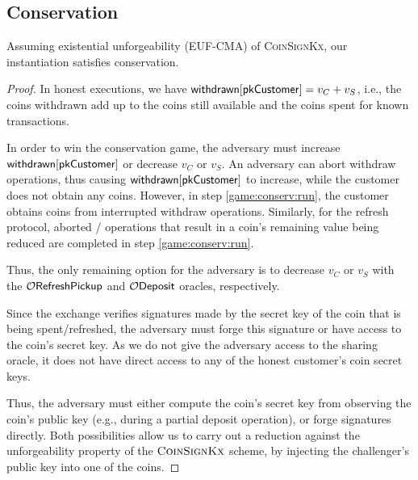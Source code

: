 \subsection{Conservation}

\begin{theorem}
  Assuming existential unforgeability (EUF-CMA) of \textsc{CoinSignKx}, our instantiation satisfies conservation.
\end{theorem}

\begin{proof}

  In honest executions, we have $\mathsf{withdrawn}[\mathsf{pkCustomer}] = v_C + v_S$, i.e.,
  the coins withdrawn add up to the coins still available and the coins spent
  for known transactions.

  In order to win the conservation game, the adversary must increase
  $\mathsf{withdrawn}[\mathsf{pkCustomer}]$ or decrease $v_C$ or $v_S$.  An adversary can
  abort withdraw operations, thus causing $\mathsf{withdrawn}[\mathsf{pkCustomer}]$ to increase,
  while the customer does not obtain any coins.  However, in step
  \ref{game:conserv:run}, the customer obtains coins from interrupted withdraw
  operations.  Similarly, for the refresh protocol, aborted  / 
  operations that result in a coin's remaining value being reduced are completed
  in step \ref{game:conserv:run}.

  Thus, the only remaining option for the adversary is to decrease $v_C$ or $v_S$
  with the $\mathcal{O}\mathsf{RefreshPickup}$ and $\mathcal{O}\mathsf{Deposit}$ oracles, respectively.

  Since the exchange verifies signatures made by the secret key of the coin
  that is being spent/refreshed, the adversary must forge this signature or have
  access to the coin's secret key.  As we do not give the adversary access to
  the sharing oracle, it does not have direct access to any of the honest
  customer's coin secret keys.

  Thus, the adversary must either compute the coin's secret key from observing
  the coin's public key (e.g., during a partial deposit operation), or forge
  signatures directly.  Both possibilities allow us to carry out a reduction
  against the unforgeability property of the $\textsc{CoinSignKx}$ scheme, by
  injecting the challenger's public key into one of the coins.

\end{proof}

